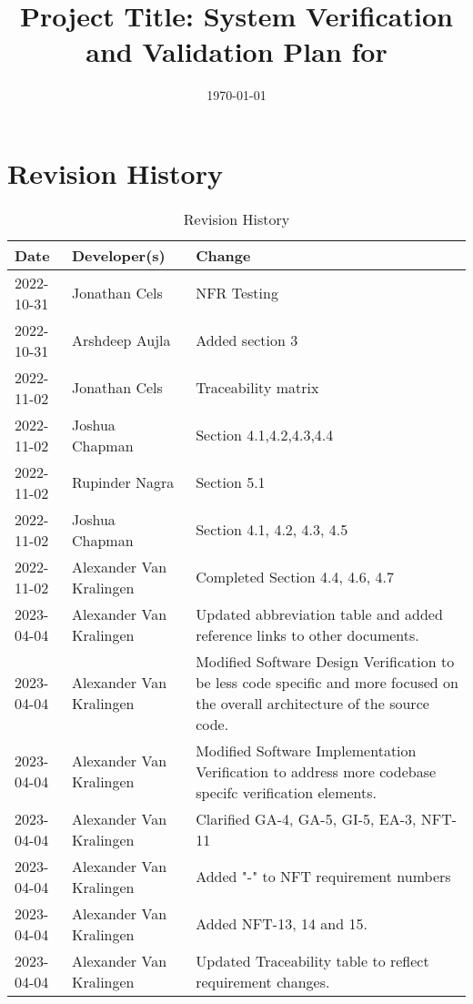 \documentclass[12pt, titlepage]{article}
\begin{document}
\title{Project Title: System Verification and Validation Plan for \progname{}} 
\author{\authname}
\date{\today}
	
\maketitle


\section{Revision History}

\begin{table}[hp]
\caption{Revision History} \label{TblRevisionHistory}
\begin{tabularx}{\textwidth}{llX}
\toprule
\textbf{Date} & \textbf{Developer(s)} & \textbf{Change}\\
\midrule
2022-10-31 & Jonathan Cels & NFR Testing\\
2022-10-31 & Arshdeep Aujla & Added section 3\\
2022-11-02 & Jonathan Cels & Traceability matrix\\
2022-11-02 & Joshua Chapman & Section 4.1,4.2,4.3,4.4\\
2022-11-02 & Rupinder Nagra & Section 5.1\\
2022-11-02 & Joshua Chapman & Section 4.1, 4.2, 4.3, 4.5\\
2022-11-02 & Alexander Van Kralingen & Completed Section 4.4, 4.6, 4.7\\
2023-04-04 & Alexander Van Kralingen & Updated abbreviation table and added reference links to other documents.\\
2023-04-04 & Alexander Van Kralingen & Modified Software Design Verification to be less code specific and more focused on the overall architecture of the source code.\\
2023-04-04 & Alexander Van Kralingen & Modified Software Implementation Verification to address more codebase specifc verification elements.\\
2023-04-04 & Alexander Van Kralingen & Clarified GA-4, GA-5, GI-5, EA-3, NFT-11\\
2023-04-04 & Alexander Van Kralingen & Added "-" to NFT requirement numbers\\
2023-04-04 & Alexander Van Kralingen & Added NFT-13, 14 and 15.\\
2023-04-04 & Alexander Van Kralingen & Updated Traceability table to reflect requirement changes.\\
\bottomrule
\end{tabularx}
\end{table}
\end{document}
